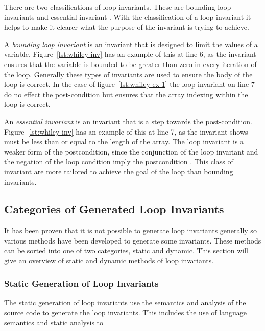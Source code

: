 There are two classifications of loop invariants.
These are bounding loop invariants and essential invariant
\cite{invarints-classifiction}.
With the classification of a loop invariant it helps to make
it clearer what the purpose of the invariant is trying to achieve.

A \textit{bounding loop invariant} is an invariant that is designed
to limit the values of a variable.
Figure~\ref{lst:whiley-inv} has an example of this at line 6, as the invariant
ensures that the variable  is bounded to be greater than zero
in every iteration of the loop.
Generally these types of invariants are used to ensure the body of the loop
is correct. In the case of figure~\ref{lst:whiley-ex-1} the loop invariant on line
7 do no effect the post-condition but ensures that the array indexing within
the loop is correct.

An \textit{essential invariant} is an invariant that is a step towards the
post-condition.
Figure~\ref{lst:whiley-inv} has an example of this at line 7,
as the invariant shows  must be less than or
equal to the length of the  array.
The loop invariant is a weaker form of the postcondition,
since the conjunction of the loop invariant and the negation
of the loop condition imply the postcondition \cite{invarints-classifiction}.
This class of invariant are more tailored to achieve
the goal of the loop than bounding invariants.

\subsection{Categories of Generated Loop Invariants}

It has been proven that it is not possible to generate loop invariants
generally %
so various methods have been developed to generate some invariants.
These methods can be sorted into one of two categories, static and dynamic.
This section will give an overview of static and dynamic methods of loop
invariants.

\subsubsection{Static Generation of Loop Invariants}

The static generation of loop invariants use the
semantics and analysis of the source code to generate the loop invariants.
This includes the use of language semantics and static analysis to

